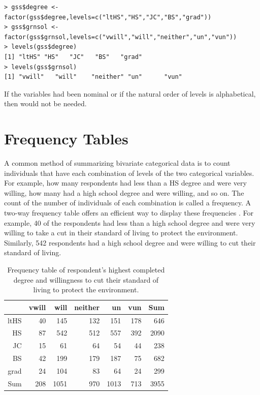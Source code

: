 \documentclass[10pt,openany]{book}\usepackage[]{graphicx}\usepackage[]{color}
\makeatletter
\newenvironment{kframe}{%
 \def\at@end@of@kframe{}%
 \ifinner\ifhmode%
  \def\at@end@of@kframe{\end{minipage}}%
  \begin{minipage}{\columnwidth}%
 \fi\fi%
 \def\FrameCommand##1{\hskip\@totalleftmargin \hskip-\fboxsep
 \colorbox{shadecolor}{##1}\hskip-\fboxsep
     \hskip-\linewidth \hskip-\@totalleftmargin \hskip\columnwidth}%
 \MakeFramed {\advance\hsize-\width
   \@totalleftmargin\z@ \linewidth\hsize
   \@setminipage}}%
 {\par\unskip\endMakeFramed%
 \at@end@of@kframe}
\newenvironment{knitrout}{}{} %
\makeatother
\begin{document}
\begin{knitrout}
\color{fgcolor}\begin{kframe}
\begin{verbatim}
> gss$degree <- factor(gss$degree,levels=c("ltHS","HS","JC","BS","grad"))
> gss$grnsol <- factor(gss$grnsol,levels=c("vwill","will","neither","un","vun"))
> levels(gss$degree)
[1] "ltHS" "HS"   "JC"   "BS"   "grad"
> levels(gss$grnsol)
[1] "vwill"   "will"    "neither" "un"      "vun"    
\end{verbatim}
\end{kframe}
\end{knitrout}
If the variables had been nominal or if the natural order of levels is alphabetical, then  would not be needed.



\section{Frequency Tables}
\vspace{-12pt}

A common method of summarizing bivariate categorical data is to count individuals that have each combination of levels of the two categorical variables.  For example, how many respondents had less than a HS degree and were very willing, how many had a high school degree and were willing, and so on.  The count of the number of individuals of each combination is called a frequency.  A two-way frequency table offers an efficient way to display these frequencies .  For example, 40 of the respondents had less than a high school degree and were very willing to take a cut in their standard of living to protect the environment.  Similarly, 542 respondents had a high school degree and were willing to cut their standard of living.

\begin{table}[ht]
\centering
\caption{Frequency table of respondent's highest completed degree and willingness to cut their standard of living to protect the environment.} 
\label{tab:EnvFreq}
\begin{tabular}{rrrrrrr}
  \hline
 & vwill & will & neither & un & vun & Sum \\ 
  \hline
ltHS & 40 & 145 & 132 & 151 & 178 & 646 \\ 
  HS & 87 & 542 & 512 & 557 & 392 & 2090 \\ 
  JC & 15 & 61 & 64 & 54 & 44 & 238 \\ 
  BS & 42 & 199 & 179 & 187 & 75 & 682 \\ 
  grad & 24 & 104 & 83 & 64 & 24 & 299 \\ 
  Sum & 208 & 1051 & 970 & 1013 & 713 & 3955 \\ 
   \hline
\end{tabular}
\end{table}
\end{document}
